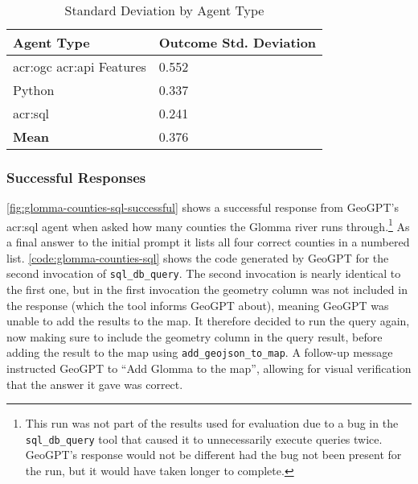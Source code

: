 \begin{table}[htbp]
    \centering
    \caption{Standard Deviation by Agent Type}
    \label{tbl:stddev-by-agent-type}
    \begin{tabularx}{0.7\textwidth}{XX}
        \toprule
        \textbf{Agent Type}                            & \textbf{Outcome Std. Deviation} \\
        \midrule
        \acrshort{acr:ogc} \acrshort{acr:api} Features & 0.552                           \\
        Python                                         & 0.337                           \\
        \acrshort{acr:sql}                             & 0.241                           \\
        \midrule
        \textbf{Mean}                                  & 0.376                           \\
        \bottomrule
    \end{tabularx}
\end{table}

\subsubsection{Successful Responses}

\autoref{fig:glomma-counties-sql-successful} shows a successful response from GeoGPT's \acrshort{acr:sql} agent when asked how many counties the Glomma river runs through.\footnote{This run was not part of the results used for evaluation due to a bug in the \texttt{sql\_db\_query} tool that caused it to unnecessarily execute queries twice. GeoGPT's response would not be different had the bug not been present for the run, but it would have taken longer to complete.} As a final answer to the initial prompt it lists all four correct counties in a numbered list. \autoref{code:glomma-counties-sql} shows the code generated by GeoGPT for the second invocation of \texttt{sql\_db\_query}. The second invocation is nearly identical to the first one, but in the first invocation the geometry column was not included in the response (which the tool informs GeoGPT about), meaning GeoGPT was unable to add the results to the map. It therefore decided to run the query again, now making sure to include the geometry column in the query result, before adding the result to the map using \texttt{add\_geojson\_to\_map}. A follow-up message instructed GeoGPT to \enquote{Add Glomma to the map}, allowing for visual verification that the answer it gave was correct.


